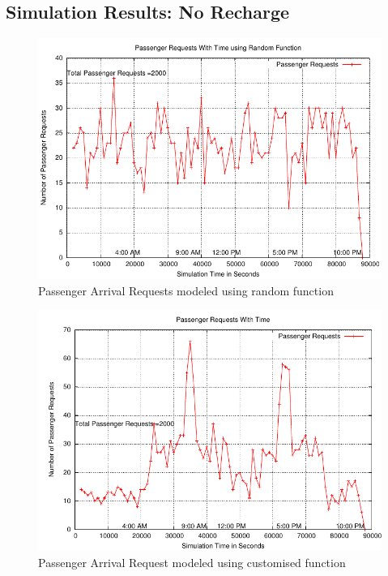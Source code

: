 \documentclass[11pt]{report}
\begin{document}
\begin{itemize}
\section{Simulation Results: No Recharge}

\begin{figure}[h!t]
\centering
\includegraphics[scale=0.9]{../plots/passengerArrivalDistribution_old}
\caption{Passenger Arrival Requests modeled using random function}\label{fig:SVM}
\end{figure}

\begin{figure}[h!t]
\centering
\includegraphics[scale=0.9]{../plots/passengerArrivalDistribution_9AM5PM}
\caption{Passenger Arrival Request modeled using customised function}\label{fig:SVM}
\end{figure}


\end{itemize}
\end{document}
